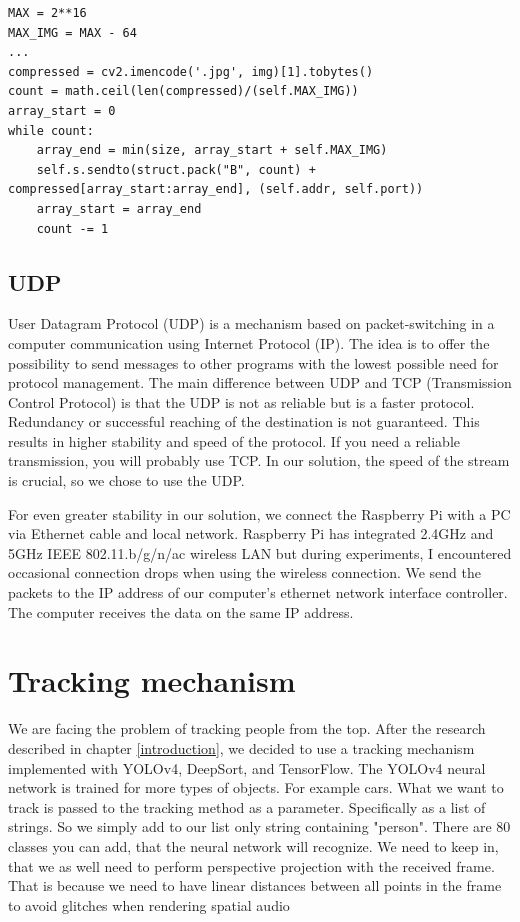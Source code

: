 \documentclass{ctuthesis}
\begin{document}
\begin{lstlisting}
MAX = 2**16
MAX_IMG = MAX - 64
...
compressed = cv2.imencode('.jpg', img)[1].tobytes()
count = math.ceil(len(compressed)/(self.MAX_IMG))
array_start = 0
while count:
    array_end = min(size, array_start + self.MAX_IMG)
    self.s.sendto(struct.pack("B", count) + compressed[array_start:array_end], (self.addr, self.port))
    array_start = array_end
    count -= 1
\end{lstlisting}

\subsection{UDP}
User Datagram Protocol (UDP)  is a mechanism based on packet-switching in a computer communication using Internet Protocol (IP)\cite{4}. The idea is to offer the possibility to send messages to other programs with the lowest possible need for protocol management. The main difference between UDP and TCP (Transmission Control Protocol) is that the UDP is not as reliable but is a faster protocol. Redundancy or successful reaching of the destination is not guaranteed. This results in higher stability and speed of the protocol. If you need a reliable transmission, you will probably use TCP\cite{5}. In our solution, the speed of the stream is crucial, so we chose to use the UDP. 

For even greater stability in our solution, we connect the Raspberry Pi with a PC via Ethernet cable and local network. Raspberry Pi has integrated 2.4GHz and 5GHz IEEE 802.11.b/g/n/ac wireless LAN \cite{1} but during experiments, I encountered occasional connection drops when using the wireless connection. We send the packets to the IP address of our computer's ethernet network interface controller. The computer receives the data on the same IP address.

\section{Tracking mechanism}
We are facing the problem of tracking people from the top. After the research described in chapter  \ref{introduction}, we decided to use a tracking mechanism implemented with YOLOv4, DeepSort, and TensorFlow\cite{89}. The YOLOv4 neural network is trained for more types of objects. For example cars. What we want to track is passed to the tracking method as a parameter. Specifically as a list of strings. So we simply add to our list only string containing "person". There are 80 classes you can add, that the neural network will recognize. We need to keep in, that we as well need to perform perspective projection with the received frame. That is because we need to have linear distances between all points in the frame to avoid glitches when rendering spatial audio
\end{document}
